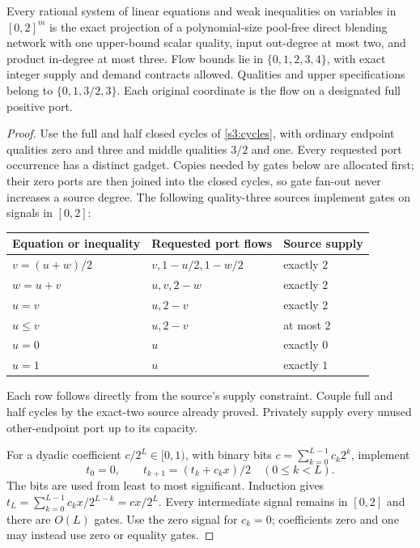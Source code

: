 \begin{lemma}\label{s3:linear-circuits}
Every rational system of linear equations and weak inequalities on
variables in $[0,2]^m$ is the exact
projection of a polynomial-size pool-free direct blending network with
one upper-bound scalar quality, input out-degree at most two, and product
in-degree at most three. Flow bounds lie in $\{0,1,2,3,4\}$, with exact
integer supply and demand contracts allowed. Qualities and upper
specifications belong to $\{0,1,3/2,3\}$. Each original coordinate
is the flow on a designated full positive port.
\end{lemma}
\begin{proof}
Use the full and half closed cycles of \cref{s3:cycles}, with ordinary
endpoint qualities zero and three and middle qualities $3/2$ and one.
Every requested port occurrence has a distinct gadget. Copies needed
by gates below are allocated first; their zero ports are then joined
into the closed cycles, so gate fan-out never increases a source degree.
The following
quality-three sources implement gates on signals in $[0,2]$:
\begin{center}
\begin{tabular}{lll}
\toprule
Equation or inequality & Requested port flows & Source supply\\
\midrule
$v=(u+w)/2$ & $v,1-u/2,1-w/2$ & exactly $2$\\
$w=u+v$ & $u,v,2-w$ & exactly $2$\\
$u=v$ & $u,2-v$ & exactly $2$\\
$u\le v$ & $u,2-v$ & at most $2$\\
$u=0$ & $u$ & exactly $0$\\
$u=1$ & $u$ & exactly $1$\\
\bottomrule
\end{tabular}
\end{center}
Each row follows directly from the source's supply constraint. Couple
full and half cycles by the exact-two source already proved. Privately
supply every unused other-endpoint port up to its capacity.

For a dyadic coefficient $c/2^L\in[0,1)$, with binary bits
$c=\sum_{k=0}^{L-1}c_k2^k$, implement
\begin{equation}
 t_0=0,\qquad t_{k+1}=(t_k+c_kx)/2\quad(0\le k<L).
 \label{s3:binary-multiplier}
\end{equation}
The bits are used from least to most significant. Induction gives
$t_L=\sum_{k=0}^{L-1}c_kx/2^{L-k}=cx/2^L$.
Every intermediate signal remains in $[0,2]$ and there are $O(L)$ gates.
Use the zero signal for $c_k=0$; coefficients zero and one may instead
use zero or equality gates.


\end{proof}
